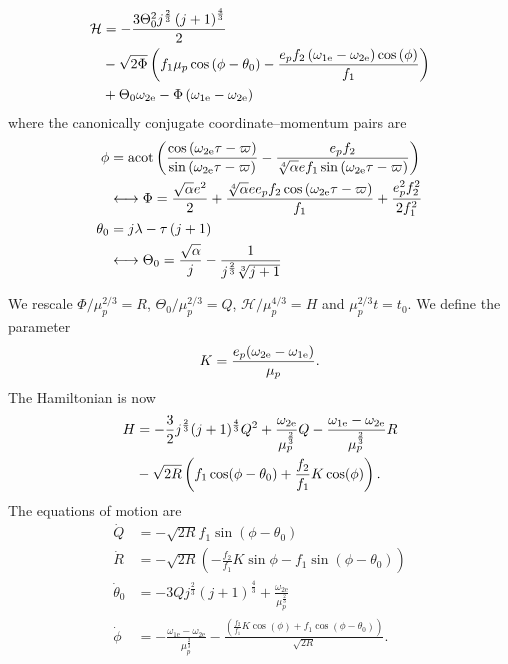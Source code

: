 \documentclass[usenatbib,twocolumn]{mnras}
\begin{document}
\begin{align}
    \mathcal H
    &=- \frac{3 \Theta_{0}^{2} j^{\frac{2}{3}} \left(j + 1\right)^{\frac{4}{3}}}{2}\nonumber\\
    &-\sqrt{2\Phi} \left(f_{1} \mu_{p} \cos{\left(\phi - \theta_{0} \right)}-\frac{ e_{p} f_{2} \left(\omega_{1\rm e} - \omega_{2\rm e}\right) \cos{\left(\phi \right)}}{f_{1}}\right) \nonumber\\
    &+\Theta_{0} \omega_{2\rm e}- \Phi \left(\omega_{1\rm e} - \omega_{2\rm e}\right) 
\end{align}
where the canonically conjugate coordinate--momentum pairs are
\begin{align}
    \phi &= \operatorname{acot}{\left(\frac{\cos{\left(\omega_{2\rm e} \tau - \varpi \right)}}{\sin{\left(\omega_{2\rm e} \tau - \varpi \right)}} - \frac{e_{p} f_{2}}{\sqrt[4]{\alpha} e f_{1} \sin{\left(\omega_{2\rm e} \tau - \varpi \right)}} \right)}\\
    &\longleftrightarrow\Phi = \frac{\sqrt{\alpha} e^{2}}{2} + \frac{\sqrt[4]{\alpha} e e_{p} f_{2} \cos{\left(\omega_{2\rm e} \tau - \varpi \right)}}{f_{1}}  + \frac{e_{p}^{2} f_{2}^{2}}{2 f_{1}^{2}}\\
    \theta_{0} &= j \lambda - \tau \left(j + 1\right)\\
    &\longleftrightarrow\Theta_{0} = \frac{\sqrt{\alpha}}{j} - \frac{1}{j^{\frac{2}{3}} \sqrt[3]{j + 1}}
\end{align}

We rescale $\Phi/\mu_p^{2/3}=R$, $\Theta_0/\mu_p^{2/3}=Q$, $\mathcal H/\mu_p^{4/3}=H$ and $\mu_p^{2/3}t=t_0$.
We define the parameter
\begin{equation}
    K=\frac{e_p(\omega_{\rm 2e}-\omega_{\rm 1e})}{\mu_p}.
\end{equation}
The Hamiltonian is now
\begin{align}\label{eq:order1H}
    H &= -\frac32 j^\frac23(j+1)^\frac43Q^2+\frac{\omega_{2\rm e}}{\mu_p^\frac23} Q - \frac{\omega_{\rm 1e}-\omega_{\rm 2e}}{\mu_p^\frac23}R\nonumber\\
    & -\sqrt{2R}\left(f_1\cos(\phi-\theta_0)+\frac{f_2}{f_1}K\cos(\phi)\right).
\end{align}
The equations of motion are 
\begin{align}
\dot Q&=- \sqrt{2R} f_{1} \sin{\left(\phi - \theta_{0} \right)}\\
\dot R&=- \sqrt{2R} \left(-\frac{f_2}{f_1}K\sin\phi - f_{1} \sin{\left(\phi - \theta_{0} \right)}\right)\\
\dot\theta_0&=- 3 Q j^{\frac{2}{3}} \left(j + 1\right)^{\frac{4}{3}} + \frac{\omega_{\mathrm{2e}}}{\mu_{p}^{\frac{2}{3}}}\\
\dot\phi&=- \frac{\omega_{\mathrm{1e}} - \omega_{\mathrm{2e}}}{\mu_{p}^{\frac{2}{3}}} - \frac{\left( \frac{f_2}{f_1}K\cos(\phi)+ f_{1} \cos{\left(\phi - \theta_{0} \right)}\right)}{ \sqrt{2R}}.
\end{align}
\end{document}
